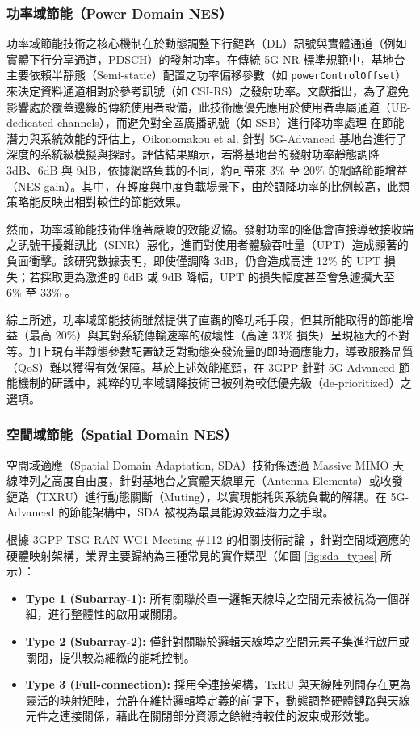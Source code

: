 \subsubsection{功率域節能（Power Domain NES）}
    功率域節能技術之核心機制在於動態調整下行鏈路（DL）訊號與實體通道（例如實體下行分享通道，PDSCH）的發射功率。在傳統 5G NR 標準規範中，基地台主要依賴半靜態（Semi-static）配置之功率偏移參數（如 \texttt{powerControlOffset}）來決定資料通道相對於參考訊號（如 CSI-RS）之發射功率。文獻指出，為了避免影響處於覆蓋邊緣的傳統使用者設備，此技術應優先應用於使用者專屬通道（UE-dedicated channels），而避免對全區廣播訊號（如 SSB）進行降功率處理 \cite{3gpp2023_tr38864}   
    在節能潛力與系統效能的評估上，Oikonomakou et al. \cite{oikonomakou2023_power} 針對 5G-Advanced 基地台進行了深度的系統級模擬與探討。評估結果顯示，若將基地台的發射功率靜態調降 3dB、6dB 與 9dB，依據網路負載的不同，約可帶來 3\% 至 20\% 的網路節能增益（NES gain）。其中，在輕度與中度負載場景下，由於調降功率的比例較高，此類策略能反映出相對較佳的節能效果。

    然而，功率域節能技術伴隨著嚴峻的效能妥協。發射功率的降低會直接導致接收端之訊號干擾雜訊比（SINR）惡化，進而對使用者體驗吞吐量（UPT）造成顯著的負面衝擊。該研究數據表明，即使僅調降 3dB，仍會造成高達 12\% 的 UPT 損失；若採取更為激進的 6dB 或 9dB 降幅，UPT 的損失幅度甚至會急遽擴大至 6\% 至 33\% \cite{oikonomakou2023_power}。

    綜上所述，功率域節能技術雖然提供了直觀的降功耗手段，但其所能取得的節能增益（最高 20\%）與其對系統傳輸速率的破壞性（高達 33\% 損失）呈現極大的不對等。加上現有半靜態參數配置缺乏對動態突發流量的即時適應能力，導致服務品質（QoS）難以獲得有效保障。基於上述效能瓶頸，在 3GPP 針對 5G-Advanced 節能機制的研議中，純粹的功率域調降技術已被列為較低優先級（de-prioritized）之選項。

\subsubsection{空間域節能（Spatial Domain NES）}
空間域適應（Spatial Domain Adaptation, SDA）技術係透過 Massive MIMO 天線陣列之高度自由度，針對基地台之實體天線單元（Antenna Elements）或收發鏈路（TXRU）進行動態關斷（Muting），以實現能耗與系統負載的解耦。在 5G-Advanced 的節能架構中，SDA 被視為最具能源效益潛力之手段。

根據 3GPP TSG-RAN WG1 Meeting \#112 的相關技術討論 \cite{huawei2023_r1_2302179}，針對空間域適應的硬體映射架構，業界主要歸納為三種常見的實作類型（如圖 \ref{fig:sda_types} 所示）：
\begin{itemize}
    \item \textbf{Type 1 (Subarray-1):} 所有關聯於單一邏輯天線埠之空間元素被視為一個群組，進行整體性的啟用或關閉。
    \item \textbf{Type 2 (Subarray-2):} 僅針對關聯於邏輯天線埠之空間元素子集進行啟用或關閉，提供較為細緻的能耗控制。
    \item \textbf{Type 3 (Full-connection):} 採用全連接架構，TxRU 與天線陣列間存在更為靈活的映射矩陣，允許在維持邏輯埠定義的前提下，動態調整硬體鏈路與天線元件之連接關係，藉此在關閉部分資源之餘維持較佳的波束成形效能。
\end{itemize}

